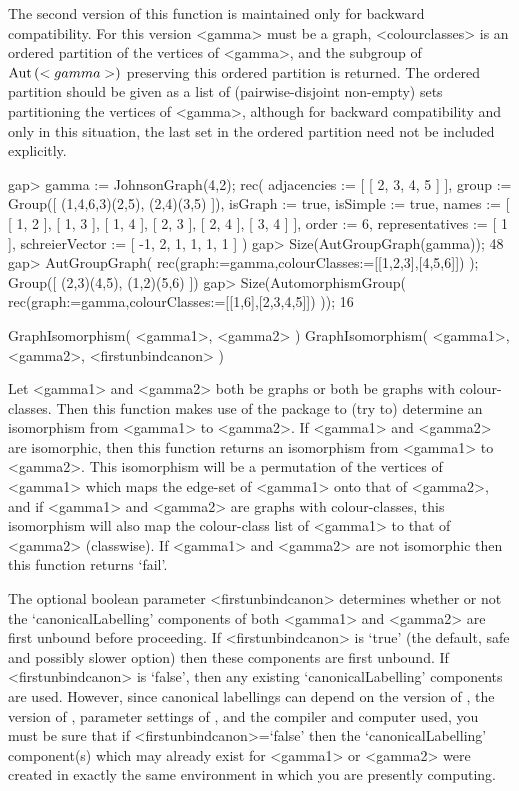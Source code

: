 The second version of this function is maintained only for backward
compatibility. For this version <gamma> must be a graph, <colourclasses>
is an ordered partition of the vertices of <gamma>, and the subgroup of
${\rm Aut}\,(<gamma>)$ preserving this ordered partition is returned. The ordered
partition should be given as a list of (pairwise-disjoint non-empty) sets
partitioning the vertices of <gamma>, although for backward compatibility
and only in this situation, the last set in the ordered partition need
not be included explicitly.

\beginexample
gap> gamma := JohnsonGraph(4,2);                   
rec( adjacencies := [ [ 2, 3, 4, 5 ] ], 
  group := Group([ (1,4,6,3)(2,5), (2,4)(3,5) ]), isGraph := true, 
  isSimple := true, 
  names := [ [ 1, 2 ], [ 1, 3 ], [ 1, 4 ], [ 2, 3 ], [ 2, 4 ], [ 3, 4 ] ], 
  order := 6, representatives := [ 1 ], 
  schreierVector := [ -1, 2, 1, 1, 1, 1 ] )
gap> Size(AutGroupGraph(gamma)); 
48
gap> AutGroupGraph( rec(graph:=gamma,colourClasses:=[[1,2,3],[4,5,6]]) ); 
Group([ (2,3)(4,5), (1,2)(5,6) ])
gap> Size(AutomorphismGroup( rec(graph:=gamma,colourClasses:=[[1,6],[2,3,4,5]]) )); 
16
\endexample


\>GraphIsomorphism( <gamma1>, <gamma2> )
\>GraphIsomorphism( <gamma1>, <gamma2>, <firstunbindcanon> )

Let <gamma1> and <gamma2> both be graphs or both be graphs with
colour-classes.  Then this function makes use of the {\nauty} package to
(try to) determine an isomorphism from <gamma1> to <gamma2>.  If <gamma1>
and <gamma2> are isomorphic, then this function returns an isomorphism
from <gamma1> to <gamma2>. This isomorphism will be a permutation of
the vertices of <gamma1> which maps the edge-set of <gamma1> onto that
of <gamma2>, and if <gamma1> and <gamma2> are graphs with colour-classes,
this isomorphism will also map the colour-class list of <gamma1> to that
of <gamma2> (classwise). If <gamma1> and <gamma2> are not isomorphic
then this function returns `fail'.

The optional boolean parameter <firstunbindcanon> determines whether or
not the `canonicalLabelling' components of both <gamma1> and <gamma2>
are first unbound before proceeding.  If <firstunbindcanon> is `true'
(the default, safe and possibly slower option) then these components
are first unbound.  If <firstunbindcanon> is `false', then any existing
`canonicalLabelling' components are used.  However, since canonical
labellings can depend on the version of {\nauty}, the version of
{\GRAPE}, parameter settings of {\nauty}, and the compiler and computer
used, you must be sure that if <firstunbindcanon>=`false' then the
`canonicalLabelling' component(s) which may already exist for <gamma1>
or <gamma2> were created in exactly the same environment in which you
are presently computing.

